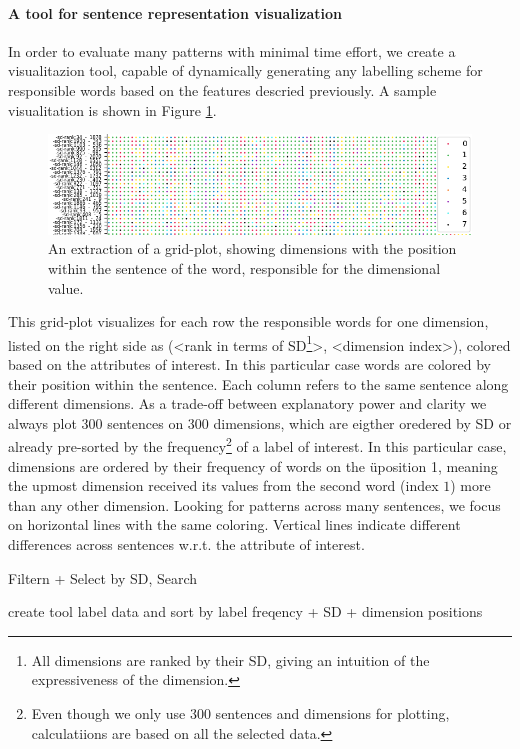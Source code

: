 \paragraph*{A tool for sentence representation visualization}
In order to evaluate many patterns with minimal time effort, we create a visualitazion tool, capable of dynamically generating any labelling scheme for responsible words based on the features descried previously. A sample visualitation is shown in Figure \ref{fig:find_position_1}.
\begin{figure}[tph!]
\centering
	\includegraphics[totalheight=4cm]{fig/finpone.png}
	\caption{An extraction of a grid-plot, showing dimensions with the position within the sentence of the word, responsible for the dimensional value.}
	\label{fig:find_position_1}
\end{figure}
This grid-plot visualizes for each row the responsible words for one dimension, listed on the right side as (<rank in terms of \ac{SD}\footnote{All dimensions are ranked by their \ac{SD}, giving an intuition of the expressiveness of the dimension.}>, <dimension index>), colored based on the attributes of interest. In this particular case words are colored by their position within the sentence.  Each column refers to the same sentence along different dimensions. As a trade-off between explanatory power and clarity we always plot 300 sentences on 300 dimensions, which are eigther oredered by \ac{SD} or already pre-sorted by the frequency\footnote{Even though we only use 300 sentences and dimensions for plotting, calculatiions are based on all the selected data.} of a label of interest. In this particular case, dimensions are ordered by their frequency of words on the üposition 1, meaning the upmost dimension received its values from the second word (index $1$) more than any other dimension. Looking for patterns across many sentences, we focus on horizontal lines with the same coloring. Vertical lines indicate different differences across sentences w.r.t. the attribute of interest.

Filtern + Select by SD, Search


create tool
label data and sort by label freqency + SD + dimension positions

